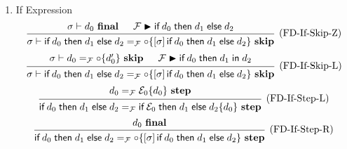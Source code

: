 \documentclass{article}
\newcommand{\entails}{\mathrel{\mathop{\vdash}}}
\newcommand{\skips}{\mathrel{\mathop{\blacktriangleright}}}
\newcommand{\final}{~\mathbf{final}}
\newcommand{\istep}{~\mathbf{step}}
\newcommand{\iskip}{~\mathbf{skip}}
\newcommand{\fin}{\mathrel{\mathop{\mathsf{in}}}}
\newcommand{\fif}{\operatorname{\mathsf{if}}}
\newcommand{\fthen}{\mathrel{\mathop{\mathsf{then}}}}
\newcommand{\felse}{\mathrel{\mathop{\mathsf{else}}}}
\begin{document}
\begin{enumerate}
\begin{enumerate}
      \item If Expression
        \[
          \begin{prooftree}
            \hypo{\sigma \entails d_0 \final}
            \hypo{\mathcal{F} \skips \fif d_0 \fthen d_1 \felse d_2}
            \infer2[(FD-If-Skip-Z)]{
              \sigma \entails
              \fif d_0 \fthen d_1 \felse d_2
              =_\mathcal{F}
              \circ \{ [\sigma] \fif d_0 \fthen d_1 \felse d_2 \} \iskip
            }
          \end{prooftree}
        \]
        \[
          \begin{prooftree}
            \hypo{\sigma \entails d_0 =_\mathcal{F} \circ \{ d_0' \} \iskip}
            \hypo{\mathcal{F} \skips \fif d_0 \fthen d_1 \fin d_2}
            \infer2[(FD-If-Skip-L)]{
              \sigma \entails
              \fif d_0 \fthen d_1 \felse d_2
              =_\mathcal{F}
              \circ \{ [\sigma] \fif d_0 \fthen d_1 \felse d_2 \} \iskip
            }
          \end{prooftree}
        \]
        \[
          \begin{prooftree}
            \hypo{d_0 =_\mathcal{F} \mathcal{E}_0 \{ d_0 \} \istep}
            \infer1[(FD-If-Step-L)]{
              \fif d_0 \fthen d_1 \felse d_2
              =_\mathcal{F}
              \fif \mathcal{E}_0 \fthen d_1 \felse d_2 \{ d_0 \} \istep
            }
          \end{prooftree}
        \]
        \[
          \begin{prooftree}
            \hypo{d_0 \final}
            \infer1[(FD-If-Step-R)]{
              \fif d_0 \fthen d_1 \felse d_2
              =_\mathcal{F}
              \circ \{ [\sigma] \fif d_0 \fthen d_1 \felse d_2 \} \istep
            }
          \end{prooftree}
        \]


\end{enumerate}
\end{enumerate}
\end{document}
